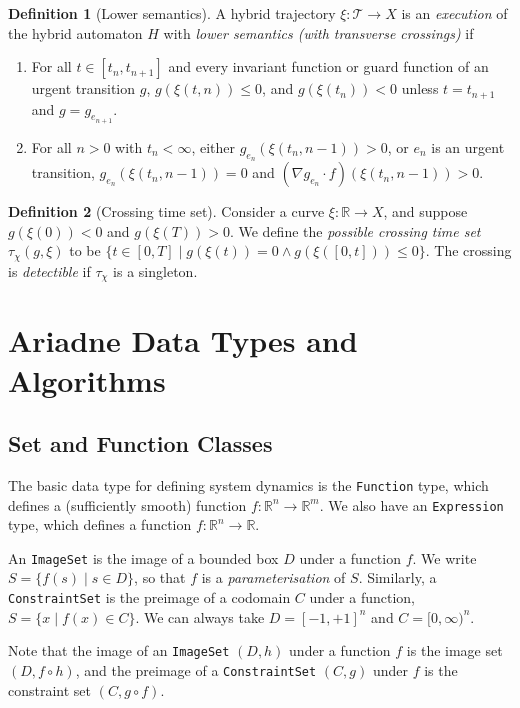 \documentclass[english,a4paper]{article}
\newcommand{\R}{\mathbb{R}}
\theoremstyle{theorem}
\theoremstyle{definition}
\newtheorem*{definition*}{Definition}
\theoremstyle{remark}
\begin{document}
\begin{definition*}[Lower semantics]
A hybrid trajectory $\xi:\mathcal{T}\rightarrow X$ is an \emph{execution} of the hybrid automaton $H$ with \emph{lower semantics (with transverse crossings)} if
\begin{enumerate}\addtocounter{enumi}{2}
\item For all $t\in[t_n,t_{n+1}]$ and every invariant function or guard function of an urgent transition $g$, $g(\xi(t,n)) \leq 0$, and $g(\xi(t_n))<0$ unless $t=t_{n+1}$ and $g=g_{e_{n+1}}$.
\item For all $n>0$ with $t_n<\infty$, either $g_{e_n}(\xi(t_n,n\!-\!1))>0$, or $e_n$ is an urgent transition, $g_{e_n}(\xi(t_n,n\!-\!1))=0$ and $(\nabla g_{e_n}\cdot f)(\xi(t_n,n\!-\!1))>0$.
\end{enumerate}
\end{definition*}

\begin{definition*}[Crossing time set]
Consider a curve $\xi:\R\rightarrow X$, and suppose $g(\xi(0))<0$ and $g(\xi(T))>0$. We define the \emph{possible crossing time set} $\tau_\chi(g,\xi)$ to be $\{ t\in [0,T] \mid g(\xi(t))=0 \wedge g(\xi([0,t]))\leq 0\}$.
The crossing is \emph{detectible} if $\tau_\chi$ is a singleton.
\end{definition*}




\section{Ariadne Data Types and Algorithms}

\subsection{Set and Function Classes}

The basic data type for defining system dynamics is the \texttt{Function} type, which defines a (sufficiently smooth) function $f:\R^n\rightarrow\R^m$. We also have an \texttt{Expression} type, which defines a function $f:\R^n\rightarrow \R$.

An \texttt{ImageSet} is the image of a bounded box $D$ under a function $f$. We write $S=\{ f(s) \mid s\in D\}$, so that $f$ is a \emph{parameterisation} of $S$. Similarly, a \texttt{ConstraintSet} is the preimage of a codomain $C$ under a function, $S=\{ x \mid f(x)\in C \}$. We can always take $D=[-1,+1]^n$ and $C=[0,\infty)^n$.

Note that the image of an \texttt{ImageSet} $(D,h)$ under a function $f$ is the image set $(D,f\circ h)$, and the preimage of a \texttt{ConstraintSet} $(C,g)$ under $f$ is the constraint set $(C,g\circ f)$.
\end{document}
